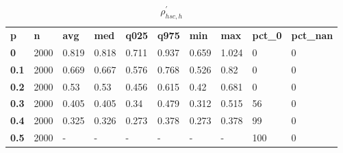 \begin{table}[h]
 \centering 
\footnotesize
\caption{$\rho_{hsc,h}^\prime $}
\label{tab:alphahsch}
\begin{tabular}[h]{| l l l l l l l l l l|
    } \hline
\textbf{ p} & \textbf{ n} & \textbf{ avg} & \textbf{ med} & \textbf{ q025} & \textbf{ q975} & \textbf{ min} & \textbf{ max} & \textbf{ pct\_0} & \textbf{ pct\_nan}
           \\
  \textbf{  0} & 2000 & 0.819 & 0.818 & 0.711 & 0.937 & 0.659 & 1.024 &   0 & 0
           \\
  \textbf{0.1} & 2000 & 0.669 & 0.667 & 0.576 & 0.768 & 0.526 &  0.82 &   0 & 0
           \\
  \textbf{0.2} & 2000 &  0.53 &  0.53 & 0.456 & 0.615 &  0.42 & 0.681 &   0 & 0
           \\
  \textbf{0.3} & 2000 & 0.405 & 0.405 &  0.34 & 0.479 & 0.312 & 0.515 &  56 & 0
           \\
  \textbf{0.4} & 2000 & 0.325 & 0.326 & 0.273 & 0.378 & 0.273 & 0.378 &  99 & 0
           \\
  \textbf{0.5} & 2000 & - & - & - & - & - & - & 100 & 0
           \\
 \hline \end{tabular}
 \end{table}
